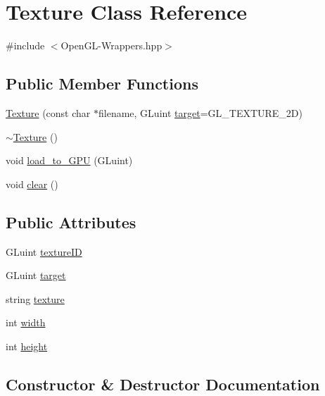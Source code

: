 \hypertarget{classTexture}{}\section{Texture Class Reference}
\label{classTexture}


{\ttfamily \#include $<$Open\+G\+L-\/\+Wrappers.\+hpp$>$}

\subsection*{Public Member Functions}
\begin{DoxyCompactItemize}
\item 
\mbox{\hyperlink{classTexture_aa063ccdd7622f00e20e1646ce3ef6dce}{Texture}} (const char $\ast$filename, G\+Luint \mbox{\hyperlink{classTexture_adc0777da3ba92545967d6cf9b8d14926}{target}}=G\+L\+\_\+\+T\+E\+X\+T\+U\+R\+E\+\_\+2D)
\item 
\mbox{\hyperlink{classTexture_a09c4bcb7462f64c1d20fa69dba3cee8a}{$\sim$\+Texture}} ()
\item 
void \mbox{\hyperlink{classTexture_a9db65830c1a20ad231183c498f711337}{load\+\_\+to\+\_\+\+G\+PU}} (G\+Luint)
\item 
void \mbox{\hyperlink{classTexture_ae02304cd1a555cd43b0af49162102a1a}{clear}} ()
\end{DoxyCompactItemize}
\subsection*{Public Attributes}
\begin{DoxyCompactItemize}
\item 
G\+Luint \mbox{\hyperlink{classTexture_ab61a414e1ed356a30c48952d65227691}{texture\+ID}}
\item 
G\+Luint \mbox{\hyperlink{classTexture_adc0777da3ba92545967d6cf9b8d14926}{target}}
\item 
string \mbox{\hyperlink{classTexture_a3b01478de1035e39ed6c88f12a0d6c1c}{texture}}
\item 
int \mbox{\hyperlink{classTexture_a06a0246cb31343557c3441c5733349cd}{width}}
\item 
int \mbox{\hyperlink{classTexture_ad37c395c65ff8bde86230908027a6fcd}{height}}
\end{DoxyCompactItemize}


\subsection{Constructor \& Destructor Documentation}
\mbox{\label{classTexture_aa063ccdd7622f00e20e1646ce3ef6dce}} 
